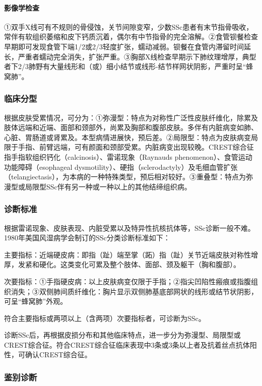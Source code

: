 \paragraph{影像学检查}

①双手X线可有不规则的骨侵蚀，关节间隙变窄，少数SSc患者有末节指骨吸收，常伴有软组织萎缩和皮下钙质沉着，偶尔有中节指骨的完全溶解。②食管钡餐检查早期即可发现食管下端1/2或2/3轻度扩张，蠕动减弱。钡餐在食管内滞留时间延长，严重者蠕动完全消失，扩张严重。③胸部X线检查早期示下肺纹理增厚，典型者下2/3肺野有大量线形和（或）细小结节或线形-结节样网状阴影，严重时呈“蜂窝肺”。

\subsubsection{临床分型}

根据皮肤受累情况，可分为：①弥漫型：特点为对称性广泛性皮肤纤维化，除累及肢体远端和近端、面部和颈部外，尚累及胸部和腹部皮肤。多伴有内脏病变如肺、心脏、胃肠道或肾累及。本型病情进展快，预后差。②局限型：特点为皮肤病变局限于手指、前臂远端，可有颜面和颈部受累。内脏病变出现较晚。CREST综合征指手指软组织钙化（calcinosis）、雷诺现象（Raynauds
phenomenon）、食管运动功能障碍（esophageal
dysmotility）、硬指（sclerodactyly）及毛细血管扩张（telangiectasis），为本病的一种特殊类型，预后相对较好。③重叠型：特点为弥漫型或局限型SSc伴有另一种或一种以上的其他结缔组织病。

\subsubsection{诊断标准}

根据雷诺现象、皮肤表现、内脏受累以及特异性抗核抗体等，SSc诊断一般不难。1980年美国风湿病学会制订的SSc分类诊断标准如下：

主要指标：近端硬皮病：即指（趾）端至掌（跖）指（趾）关节近端皮肤对称性增厚，发紧和硬化。这类变化可累及整个肢体、面部、颈及躯干（胸和腹部）。

次要指标：①手指硬皮病：以上皮肤病变仅限于手指；②指尖凹陷性瘢痕或指腹组织消失；③双侧肺间质纤维化：胸片显示双侧肺基底部网状的线形或结节状阴影，可呈“蜂窝肺”外观。

符合主要指标或两项以上（含两项）次要指标者，可诊断为SSc。

诊断SSc后，再根据皮损分布和其他临床特点，进一步分为弥漫型、局限型或CREST综合征。符合CREST综合征临床表现中3条或3条以上者及抗着丝点抗体阳性，可确认CREST综合征。

\subsubsection{鉴别诊断}

